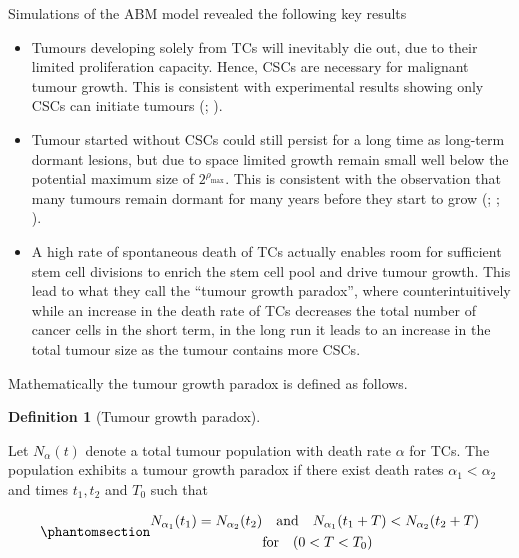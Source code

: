 \documentclass[
  letterpaper,
]{scrreprt}
\providecommand{\tightlist}{%
  \setlength{\itemsep}{0pt}\setlength{\parskip}{0pt}}\usepackage{longtable,booktabs,array}
\theoremstyle{definition}
\newtheorem{definition}{Definition}[chapter]
\theoremstyle{remark}
\begin{document}
Simulations of the ABM model revealed the following key results

\begin{itemize}
\tightlist
\item
  Tumours developing solely from TCs will inevitably die out, due to
  their limited proliferation capacity. Hence, CSCs are necessary for
  malignant tumour growth. This is consistent with experimental results
  showing only CSCs can initiate tumours
  (;
  ).
\item
  Tumour started without CSCs could still persist for a long time as
  long-term dormant lesions, but due to space limited growth remain
  small well below the potential maximum size of
  \(2^{\rho_\text{max}}\). This is consistent with the observation that
  many tumours remain dormant for many years before they start to grow
  (;
  ;
  ).
\item
  A high rate of spontaneous death of TCs actually enables room for
  sufficient stem cell divisions to enrich the stem cell pool and drive
  tumour growth. This lead to what they call the ``tumour growth
  paradox'', where counterintuitively while an increase in the death
  rate of TCs decreases the total number of cancer cells in the short
  term, in the long run it leads to an increase in the total tumour size
  as the tumour contains more CSCs.
\end{itemize}

Mathematically the tumour growth paradox is defined as follows.

\begin{definition}[Tumour growth
paradox]\protect\hypertarget{def-tumor-growth-paradox}{}\label{def-tumor-growth-paradox}

Let \(N_\alpha (t)\) denote a total tumour population with death rate
\(\alpha\) for TCs. The population exhibits a tumour growth paradox if
there exist death rates \(\alpha_1 < \alpha_2\) and times \(t_1,t_2\)
and \(T_0\) such that

\begin{equation}\phantomsection\label{eq-tumour-growth-paradox}{
\begin{aligned}
N_{\alpha_1}(t_1) = N_{\alpha_2}(t_2)& \quad \text{and} \quad N_{\alpha_1}(t_1 + T) < N_{\alpha_2}(t_2 + T) \\
&\text{for} \quad (0<T<T_0) 
\end{aligned}
}\end{equation}

\end{definition}
\end{document}

